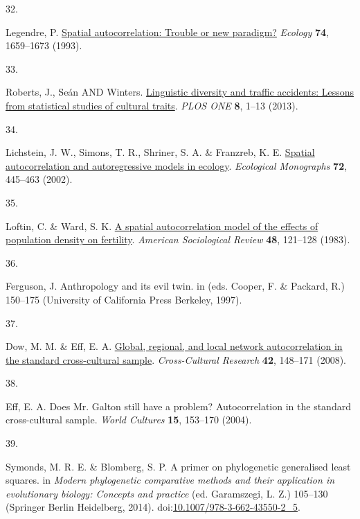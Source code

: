 \documentclass[
  man,floatsintext]{apa6}
\newlength{\cslhangindent}
\newlength{\csllabelwidth}
\newlength{\cslentryspacingunit} %
\newenvironment{CSLReferences}[2] %
 {%
  \setlength{\parindent}{0pt}
  \ifodd #1
  \let\oldpar\par
  \def\par{\hangindent=\cslhangindent\oldpar}
  \fi
  \setlength{\parskip}{#2\cslentryspacingunit}
 }%
 {}
\newcommand{\CSLLeftMargin}[1]{\parbox[t]{\csllabelwidth}{#1}}
\newcommand{\CSLRightInline}[1]{\parbox[t]{\linewidth - \csllabelwidth}{#1}\break}
\begin{document}
\begin{CSLReferences}{0}{0}
\leavevmode{}%
\CSLLeftMargin{32. }%
\CSLRightInline{Legendre, P. \href{https://doi.org/10.2307/1939924}{Spatial autocorrelation: Trouble or new paradigm?} \emph{Ecology} \textbf{74}, 1659--1673 (1993).}

\leavevmode{}%
\CSLLeftMargin{33. }%
\CSLRightInline{Roberts, J., Seán AND Winters. \href{https://doi.org/10.1371/journal.pone.0070902}{Linguistic diversity and traffic accidents: Lessons from statistical studies of cultural traits}. \emph{PLOS ONE} \textbf{8}, 1--13 (2013).}

\leavevmode{}%
\CSLLeftMargin{34. }%
\CSLRightInline{Lichstein, J. W., Simons, T. R., Shriner, S. A. \& Franzreb, K. E. \href{https://doi.org/10.1890/0012-9615(2002)072\%5B0445:SAAAMI\%5D2.0.CO;2}{Spatial autocorrelation and autoregressive models in ecology}. \emph{Ecological Monographs} \textbf{72}, 445--463 (2002).}

\leavevmode{}%
\CSLLeftMargin{35. }%
\CSLRightInline{Loftin, C. \& Ward, S. K. \href{https://doi.org/10.2307/2095150}{A spatial autocorrelation model of the effects of population density on fertility}. \emph{American Sociological Review} \textbf{48}, 121--128 (1983).}

\leavevmode{}%
\CSLLeftMargin{36. }%
\CSLRightInline{Ferguson, J. Anthropology and its evil twin. in (eds. Cooper, F. \& Packard, R.) 150--175 (University of California Press Berkeley, 1997).}

\leavevmode{}%
\CSLLeftMargin{37. }%
\CSLRightInline{Dow, M. M. \& Eff, E. A. \href{https://doi.org/10.1177/1069397107311186}{Global, regional, and local network autocorrelation in the standard cross-cultural sample}. \emph{Cross-Cultural Research} \textbf{42}, 148--171 (2008).}

\leavevmode{}%
\CSLLeftMargin{38. }%
\CSLRightInline{Eff, E. A. Does {M}r. {G}alton still have a problem? Autocorrelation in the standard cross-cultural sample. \emph{World Cultures} \textbf{15}, 153--170 (2004).}

\leavevmode{}%
\CSLLeftMargin{39. }%
\CSLRightInline{Symonds, M. R. E. \& Blomberg, S. P. A primer on phylogenetic generalised least squares. in \emph{Modern phylogenetic comparative methods and their application in evolutionary biology: Concepts and practice} (ed. Garamszegi, L. Z.) 105--130 (Springer Berlin Heidelberg, 2014). doi:\href{https://doi.org/10.1007/978-3-662-43550-2_5}{10.1007/978-3-662-43550-2\_5}.}


\end{CSLReferences}
\end{document}

